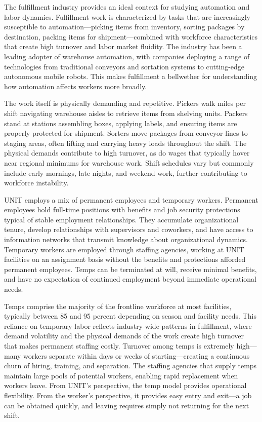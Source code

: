 \documentclass[12pt]{article}
\begin{document}
The fulfillment industry provides an ideal context for studying automation and labor dynamics. Fulfillment work is characterized by tasks that are increasingly susceptible to automation---picking items from inventory, sorting packages by destination, packing items for shipment---combined with workforce characteristics that create high turnover and labor market fluidity. The industry has been a leading adopter of warehouse automation, with companies deploying a range of technologies from traditional conveyors and sortation systems to cutting-edge autonomous mobile robots. This makes fulfillment a bellwether for understanding how automation affects workers more broadly.

The work itself is physically demanding and repetitive. Pickers walk miles per shift navigating warehouse aisles to retrieve items from shelving units. Packers stand at stations assembling boxes, applying labels, and ensuring items are properly protected for shipment. Sorters move packages from conveyor lines to staging areas, often lifting and carrying heavy loads throughout the shift. The physical demands contribute to high turnover, as do wages that typically hover near regional minimums for warehouse work. Shift schedules vary but commonly include early mornings, late nights, and weekend work, further contributing to workforce instability.

UNIT employs a mix of permanent employees and temporary workers. Permanent employees hold full-time positions with benefits and job security protections typical of stable employment relationships. They accumulate organizational tenure, develop relationships with supervisors and coworkers, and have access to information networks that transmit knowledge about organizational dynamics. Temporary workers are employed through staffing agencies, working at UNIT facilities on an assignment basis without the benefits and protections afforded permanent employees. Temps can be terminated at will, receive minimal benefits, and have no expectation of continued employment beyond immediate operational needs.

Temps comprise the majority of the frontline workforce at most facilities, typically between 85 and 95 percent depending on season and facility needs. This reliance on temporary labor reflects industry-wide patterns in fulfillment, where demand volatility and the physical demands of the work create high turnover that makes permanent staffing costly. Turnover among temps is extremely high---many workers separate within days or weeks of starting---creating a continuous churn of hiring, training, and separation. The staffing agencies that supply temps maintain large pools of potential workers, enabling rapid replacement when workers leave. From UNIT's perspective, the temp model provides operational flexibility. From the worker's perspective, it provides easy entry and exit---a job can be obtained quickly, and leaving requires simply not returning for the next shift.
\end{document}
